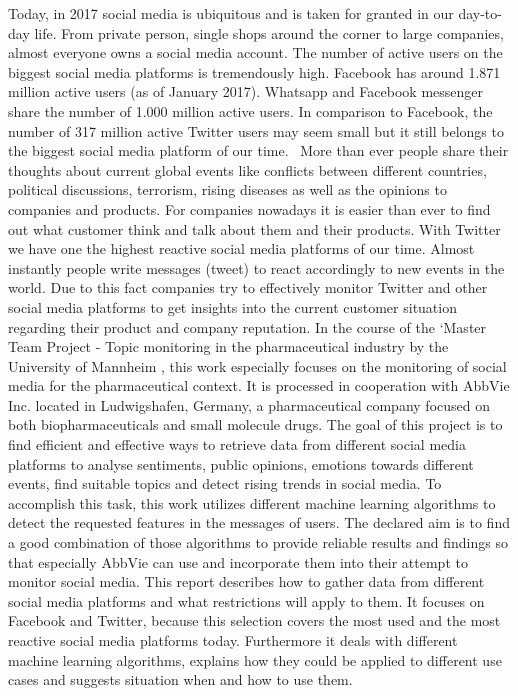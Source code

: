 \documentclass[11pt,titlepage,oneside,openany]{book}
\begin{document}
Today, in 2017 social media is ubiquitous and is taken for granted in our day-to-day life. From private person, single shops around the corner to large companies, almost everyone owns a social media account. The number of active users on the biggest social media platforms is tremendously high. Facebook has around 1.871 million active users (as of January 2017). Whatsapp and Facebook messenger share the number of 1.000 million active users. In comparison to Facebook, the number of 317 million active Twitter users may seem small but it still belongs to  the biggest social media platform of our time.~\cite{Chaffey2017-04-27}\newline 
More than ever people share their thoughts about current global events like conflicts between different countries, political discussions, terrorism, rising diseases as well as the opinions to companies and products. 
For companies nowadays it is easier than ever to find out what customer think and talk about them and their products. With Twitter we have one the highest reactive social media platforms of our time. Almost instantly people write messages (tweet) to react accordingly to new events in the world. Due to this fact companies try to effectively monitor Twitter and other social media platforms to get insights into the current customer situation regarding their product and company reputation.
In the course of the ‘Master Team Project - Topic monitoring in the pharmaceutical industry by the University of Mannheim , this work especially focuses on the monitoring of social media for the pharmaceutical context. It is processed in cooperation with AbbVie Inc. located in Ludwigshafen, Germany, a pharmaceutical company focused on both biopharmaceuticals and small molecule drugs. The goal of this project is to find efficient and effective ways to retrieve data from different social media platforms to analyse sentiments, public opinions, emotions towards different events, find suitable topics and detect rising trends in social media. To accomplish this task, this work utilizes different machine learning algorithms to detect the requested features in the messages of users. The declared aim is to find a good combination of those algorithms to provide reliable results and findings so that especially AbbVie can use and incorporate them into their attempt to monitor social media.\newline 
This report describes how to gather data from different social media platforms and what restrictions will apply to them. It focuses on Facebook and Twitter, because this selection covers the most used and the most reactive social media platforms today. Furthermore it deals with different machine learning algorithms, explains how they could be applied to different use cases and suggests situation when and how to use them. 
\end{document}
